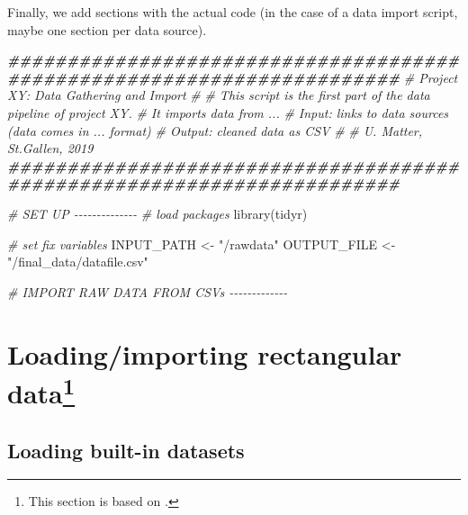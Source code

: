 \documentclass[
  12pt,
]{style/krantz}
\newenvironment{Shaded}{\begin{snugshade}}{\end{snugshade}}
\newcommand{\CommentTok}[1]{\textcolor[rgb]{0.56,0.35,0.01}{\textit{#1}}}
\newcommand{\DocumentationTok}[1]{\textcolor[rgb]{0.56,0.35,0.01}{\textbf{\textit{#1}}}}
\newcommand{\FunctionTok}[1]{\textcolor[rgb]{0.00,0.00,0.00}{#1}}
\newcommand{\NormalTok}[1]{#1}
\newcommand{\OtherTok}[1]{\textcolor[rgb]{0.56,0.35,0.01}{#1}}
\newcommand{\StringTok}[1]{\textcolor[rgb]{0.31,0.60,0.02}{#1}}
\begin{document}
Finally, we add sections with the actual code (in the case of a data import script, maybe one section per data source).

\begin{Shaded}
\begin{Highlighting}[]
\DocumentationTok{\#\#\#\#\#\#\#\#\#\#\#\#\#\#\#\#\#\#\#\#\#\#\#\#\#\#\#\#\#\#\#\#\#\#\#\#\#\#\#\#\#\#\#\#\#\#\#\#\#\#\#\#\#\#\#\#\#\#\#\#\#\#\#\#\#\#\#\#\#\#\#}
\CommentTok{\# Project XY: Data Gathering and Import}
\CommentTok{\#}
\CommentTok{\# This script is the first part of the data pipeline of project XY.}
\CommentTok{\# It imports data from ...}
\CommentTok{\# Input: links to data sources (data comes in ... format)}
\CommentTok{\# Output: cleaned data as CSV}
\CommentTok{\#}
\CommentTok{\# U. Matter, St.Gallen, 2019}
\DocumentationTok{\#\#\#\#\#\#\#\#\#\#\#\#\#\#\#\#\#\#\#\#\#\#\#\#\#\#\#\#\#\#\#\#\#\#\#\#\#\#\#\#\#\#\#\#\#\#\#\#\#\#\#\#\#\#\#\#\#\#\#\#\#\#\#\#\#\#\#\#\#\#\#}


\CommentTok{\# SET UP {-}{-}{-}{-}{-}{-}{-}{-}{-}{-}{-}{-}{-}{-}}
\CommentTok{\# load packages}
\FunctionTok{library}\NormalTok{(tidyr)}

\CommentTok{\# set fix variables}
\NormalTok{INPUT\_PATH }\OtherTok{\textless{}{-}} \StringTok{"/rawdata"}
\NormalTok{OUTPUT\_FILE }\OtherTok{\textless{}{-}} \StringTok{"/final\_data/datafile.csv"}


\CommentTok{\# IMPORT RAW DATA FROM CSVs {-}{-}{-}{-}{-}{-}{-}{-}{-}{-}{-}{-}{-}}
\end{Highlighting}
\end{Shaded}

\hypertarget{loadingimporting-rectangular-data}{%
\section[Loading/importing rectangular data]{\texorpdfstring{Loading/importing rectangular data\footnote{This section is based on \citet{umatter_2018}.}}{Loading/importing rectangular data}}\label{loadingimporting-rectangular-data}}

\hypertarget{loading-built-in-datasets}{%
\subsection{Loading built-in datasets}\label{loading-built-in-datasets}}
\end{document}
